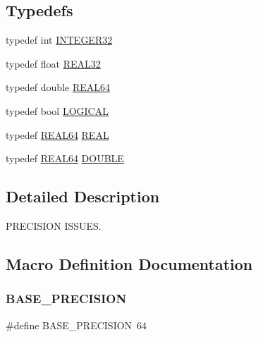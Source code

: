 \subsection*{Typedefs}
\begin{DoxyCompactItemize}
\item 
typedef int \mbox{\hyperlink{adat-devel_2lib_2ensem_2ensem__precision_8h_af9ea51a62d33df371d837a018fe1a22e}{I\+N\+T\+E\+G\+E\+R32}}
\item 
typedef float \mbox{\hyperlink{adat-devel_2lib_2ensem_2ensem__precision_8h_aba070372e01b28d5afdf9257e8e4390c}{R\+E\+A\+L32}}
\item 
typedef double \mbox{\hyperlink{adat-devel_2lib_2ensem_2ensem__precision_8h_aa31d9c0fbe9c64fbd64dd463f6e63178}{R\+E\+A\+L64}}
\item 
typedef bool \mbox{\hyperlink{adat-devel_2lib_2ensem_2ensem__precision_8h_aae96530932e7073fe821140b57d9faff}{L\+O\+G\+I\+C\+AL}}
\item 
typedef \mbox{\hyperlink{adat-devel_2lib_2ensem_2ensem__precision_8h_aa31d9c0fbe9c64fbd64dd463f6e63178}{R\+E\+A\+L64}} \mbox{\hyperlink{adat-devel_2lib_2ensem_2ensem__precision_8h_ad013361bb53824d5957cb0b391c72290}{R\+E\+AL}}
\item 
typedef \mbox{\hyperlink{adat-devel_2lib_2ensem_2ensem__precision_8h_aa31d9c0fbe9c64fbd64dd463f6e63178}{R\+E\+A\+L64}} \mbox{\hyperlink{adat-devel_2lib_2ensem_2ensem__precision_8h_abcfc24a032c589afd6af1f9e4da2d5af}{D\+O\+U\+B\+LE}}
\end{DoxyCompactItemize}


\subsection{Detailed Description}
P\+R\+E\+C\+I\+S\+I\+ON I\+S\+S\+U\+ES. 



\subsection{Macro Definition Documentation}
\mbox{\label{adat-devel_2lib_2ensem_2ensem_8h_a9620d5bc7c8b375f3c2a46815e94ac6f}} 
\subsubsection{\texorpdfstring{BASE\_PRECISION}{BASE\_PRECISION}\hspace{0.1cm}{\footnotesize\ttfamily [1/2]}}
{\footnotesize\ttfamily \#define B\+A\+S\+E\+\_\+\+P\+R\+E\+C\+I\+S\+I\+ON~64}

